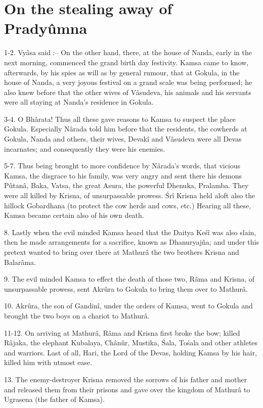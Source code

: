 ﻿\chapter{On the stealing away of Pradyûmna}

1-2. Vy\^asa said :-- On the other hand, there, at the house of Nanda, early in the next morning, commenced the grand birth day festivity. Kamsa came to know, afterwards, by his spies as will as by general rumour, that at Gokula, in the house of Nanda, a very joyous festival on a grand scale was being performed; he also knew before that the other wives of V\^asudeva, his animals and his servants were all staying at Nanda's residence in Gokula.

3-4. O Bh\^arata! Thus all these gave reasons to Kamsa to suspect the place Gokula. Especially N\^arada told him before that the residents, the cowherds at Gokula, Nanda and others, their wives, Devak\^i and V\^asudeva were all Devas incarnates; and consequently they were his enemies.

5-7. Thus being brought to more confidence by N\^arada's words, that vicious Kamsa, the disgrace to his family, was very angry and sent there his demons Pûtan\^a, Baka, Vatsa, the great Asura, the powerful Dhenuka, Pralamba. They were all killed by Krisna, of unsurpassable prowess. \'Sr\^i Krisna held aloft also the hillock Gobardhana (to protect the cow herds and cows, etc.) Hearing all these, Kamsa became certain also of his own death.

8. Lastly when the evil minded Kamsa heard that the Daitya Ke\'s\^i was also slain, then he made arrangements for a sacrifice, known as Dhanuryajña; and under this pretext wanted to bring over there at Mathur\^a the two brothers Krisna and Balar\^ama.

9. The evil minded Kamsa to effect the death of those two, R\^ama and Krisna, of unsurpassable prowess, sent Akrûra to Gokula to bring them over to Mathur\^a.

10. Akrûra, the son of Gandin\^i, under the orders of Kamsa, went to Gokula and brought the two boys on a chariot to Mathur\^a.

11-12. On arriving at Mathur\^a, R\^ama and Krisna first broke the bow; killed R\^ajaka, the elephant Kubalaya, Ch\^anûr, Mustika, \'Sala, To\'sala and other athletes and warriors. Last of all, Hari, the Lord of the Devas, holding Kamsa by his hair, killed him with utmost ease.

13. The enemy-destroyer Krisna removed the sorrows of his father and mother and released them from their prisons and gave over the kingdom of Mathur\^a to Ugrasena (the father of Kamsa).

